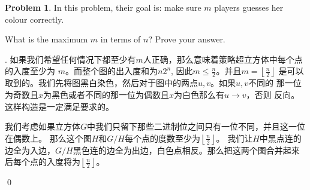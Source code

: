 \documentclass[UTF8]{ctexart}
\newenvironment{sol}
  {\par\vspace{3mm}\noindent{\it Solution}.}
  {\qed \\ \medskip}
\theoremstyle{definition}
\newtheorem{problem}{Problem}
\begin{document}
\begin{problem}
In this problem, their goal is: make sure $m$ players guesses her colour correctly.

What is the maximum $m$ in terms of $n$? Prove your answer. 
\begin{sol}
    如果我们希望任何情况下都至少有$m$人正确，那么意味着策略超立方体中每个点的入度至少为
    $m$。而整个图的出入度和为$n2^n$, 因此$m \leq \frac n 2$。并且$m=\left\lfloor\frac n 2 \right\rfloor$
    是可以取到的。我们先将图黑白染色，然后对于图中的两点$u, v$。如果$u,v$不同的
    那一位为奇数且$x$为黑色或者不同的那一位为偶数且$x$为白色那么有$u \rightarrow v$，否则
    反向。这样构造是一定满足要求的。
    
    我们考虑如果立方体$G$中我们只留下那些二进制位之间只有一位不同，并且这一位在偶数上。
    那么这个图$H$和$G/H$每个点的度数至少为$\left\lfloor\frac n 2 \right\rfloor$。
    我们让$H$中黑点连的边全为入边，$G/H$黑色连的边全为出边，白色点相反。那么把这两个图合并起来
    后每个点的入度将为$\left\lfloor\frac n 2 \right\rfloor$。

\end{sol}
\end{problem}
\end{document}
